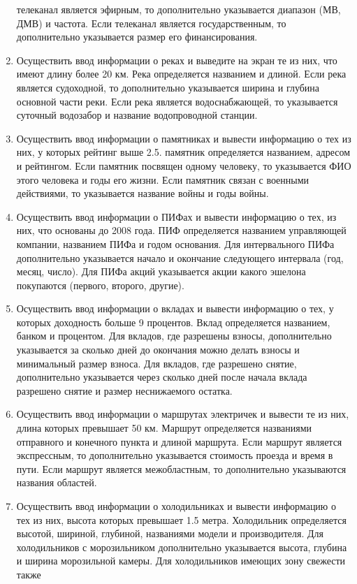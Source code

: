 \begin{enumerate}
телеканал является эфирным, то дополнительно указывается диапазон (МВ, ДМВ) и частота.
Если телеканал является государственным, то дополнительно указывается размер его финансирования.
\item Осуществить ввод информации о реках и выведите на экран те из них, что имеют длину более
20 км. Река определяется названием и длиной. Если река является судоходной, то дополнительно
указывается ширина и глубина основной части реки. Если река является водоснабжающей, то
указывается суточный водозабор и название водопроводной станции.
\item Осуществить ввод информации о памятниках и вывести информацию о тех из них, у которых
рейтинг выше 2.5. памятник определяется названием, адресом и рейтингом. Если памятник посвящен одному человеку, то указывается ФИО этого человека и годы его жизни. Если памятник
связан с военными действиями, то указывается название войны и годы войны.
\item Осуществить ввод информации о ПИФах и вывести информацию о тех, из них, что основаны до
2008 года. ПИФ определяется названием управляющей компании, названием ПИФа и годом основания. Для интервального ПИФа дополнительно указывается начало и окончание следующего
интервала (год, месяц, число). Для ПИФа акций указывается акции какого эшелона покупаются
(первого, второго, другие).
\item Осуществить ввод информации о вкладах и вывести информацию о тех, у которых доходность
больше 9 процентов. Вклад определяется названием, банком и процентом. Для вкладов, где разрешены взносы, дополнительно указывается за сколько дней до окончания можно делать взносы
и минимальный размер взноса. Для вкладов, где разрешено снятие, дополнительно указывается
через сколько дней после начала вклада разрешено снятие и размер неснижаемого остатка.
\item Осуществить ввод информации о маршрутах электричек и вывести те из них, длина которых
превышает 50 км. Маршрут определяется названиями отправного и конечного пункта и длиной
маршрута. Если маршрут является экспрессным, то дополнительно указывается стоимость проезда и время в пути. Если маршрут является межобластным, то дополнительно указываются
названия областей.
\item Осуществить ввод информации о холодильниках и вывести информацию о тех из них, высота которых превышает 1.5 метра. Холодильник определяется высотой, шириной, глубиной, названиями
модели и производителя. Для холодильников с морозильником дополнительно указывается высота, глубина и ширина морозильной камеры. Для холодильников имеющих зону свежести также

\end{enumerate}
